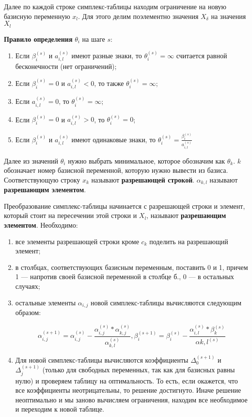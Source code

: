 \documentclass{article}
\begin{document}
Далее по каждой строке симплекс-таблицы находим ограничение на новую базисную переменную $x_{l}$. Для этого делим поэлементно значения $X_{\delta}$ на значения $X_{l}$

\textbf{Правило определения} $\theta_{i}$ на шаге $s$:

\begin{enumerate}
    \item Если $\beta_{i}^{(s)}$ и $a_{i, l}^{(s)}$ имеют разные знаки, то $\theta_{i}^{(s)} = \infty$ считается равной бесконечности (нет ограничений);
    \item Если $\beta_{i}^{(s)} = 0$ и $a_{i, l}^{(s)} < 0$, то также $\theta_{i}^{(s)} = \infty$;
    \item Если $a_{i, l}^{(s)} = 0$, то $\theta_{i}^{(s)} = \infty$;
    \item Если $\beta_{i}^{(s)} = 0$ и $a_{i, l}^{(s)} > 0$, то $\theta_{i}^{(s)} = 0$;
    \item Если $\beta_{i}^{(s)} $ и $a_{i, l}^{(s)}$ имеют одинаковые знаки, то $\theta_{i}^{(s)} = \frac{\beta_{i}^{(s)}}{a_{i, l}^{(s)}}$
\end{enumerate}

Далее из значений $\theta_{i}$ нужно выбрать минимальное, которое обозначим как $\theta_{k}$. $k$ обозначает номер базисной переменной, которую нужно вывести из базиса. Соответствующую строку $x_{k}$ называют \textbf{разрешающей строкой}. $\alpha_{k, l}$ называют \textbf{разрешающим элементом}.

Преобразование симплекс-таблицы начинается с разрешающей строки и элемент, который стоит на пересечении этой строки и $X_{l}$, называют \textbf{разрешающим элементом}. Необходимо:

\begin{enumerate}
    \item все элементы разрешающей строки кроме $c_{k}$ поделить на разрешающий элемент;
    \item в столбцах, соответствующих базисным переменным, поставить 0 и 1, причем 1 — напротив своей базисной переменной в столбце б., 0 — в остальных случаях;
    \item остальные элементы $\alpha_{i, j}$ новой симплекс-таблицы вычисляются следующим образом:
    
    $$\alpha_{i, j}^{(s + 1)} = \alpha_{i, j}^{(s)} - \frac{\alpha_{i, j}^{(s)} * \alpha_{k, j}^{(s)}}{\alpha_{k, l}^{(s)}}, \beta_{i}^{(s + 1)} = \beta_{i}^{(s)} - \frac{\alpha_{i, l}^{(s)} * \beta_{k}^{(s)}}{\alpha{k, l}^{(s)}}$$
    \item Для новой симплекс-таблицы вычисляются коэффициенты $\Delta_{0}^{(s + 1)}$ и $\Delta_{j}^{(s + 1)}$ (только для свободных переменных, так как для базисных равны нулю) и проверяем таблицу на оптимальность. То есть, если окажется, что все коэффициенты неотрицательны, то решение достигнуто. Иначе решение неоптимально и мы заново вычисляем ограничения, находим все необходимое и переходим к новой таблице.
\end{enumerate}
\end{document}
